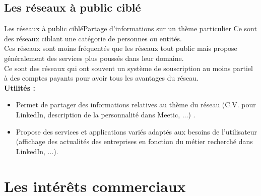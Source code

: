 \documentclass{beamer}
\begin{document}
\subsection{Les réseaux à public ciblé}
\begin{frame}{Les réseaux à public ciblé}{Partage d'informations sur un thème particulier}
	Ce sont des réseaux ciblant une catégorie de personnes ou entités.\\
	Ces réseaux sont moins fréquentés que les réseaux tout public mais propose généralement des services plus poussés dans leur domaine.\\
	Ce sont des réseaux qui ont souvent un système de souscription au moins partiel à des comptes payants pour avoir tous les avantages du réseau.\\
	\textbf{Utilités : }
	\begin{itemize}
		\item Permet de partager des informations relatives au thème du réseau (C.V. pour LinkedIn, description de la personnalité dans Meetic, ...) .
		\item Propose des services et applications variés adaptés aux besoins de l'utilisateur (affichage des actualités des entreprises en fonction du métier recherché dans LinkedIn, ...).
	\end{itemize}
\end{frame}
\section{Les intérêts commerciaux}
\end{document}
